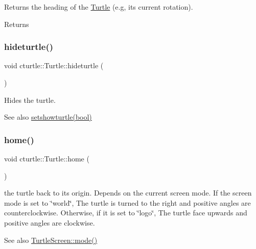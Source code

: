 Returns the heading of the \hyperlink{classcturtle_1_1Turtle}{Turtle} (e.\+g, its current rotation). \begin{DoxyReturn}{Returns}

\end{DoxyReturn}
\mbox{\label{classcturtle_1_1Turtle_a9703e6352bb71bb995ad0d364be66a49}} 
\subsubsection{\texorpdfstring{hideturtle()}{hideturtle()}}
{\footnotesize\ttfamily void cturtle\+::\+Turtle\+::hideturtle (\begin{DoxyParamCaption}{ }\end{DoxyParamCaption})\hspace{0.3cm}{\ttfamily [inline]}}



Hides the turtle. 

\begin{DoxySeeAlso}{See also}
\hyperlink{classcturtle_1_1Turtle_a9e83fdd5c469e4863cf9b460e4d29130}{setshowturtle(bool)} 
\end{DoxySeeAlso}
\mbox{\label{classcturtle_1_1Turtle_ab6558ff8b547bfb54a68c55259f7bb32}} 
\subsubsection{\texorpdfstring{home()}{home()}}
{\footnotesize\ttfamily void cturtle\+::\+Turtle\+::home (\begin{DoxyParamCaption}{ }\end{DoxyParamCaption})}

the turtle back to its origin. Depends on the current screen mode. If the screen mode is set to \char`\"{}world\char`\"{}, The turtle is turned to the right and positive angles are counterclockwise. Otherwise, if it is set to \char`\"{}logo\char`\"{}, The turtle face upwards and positive angles are clockwise. \begin{DoxySeeAlso}{See also}
\hyperlink{classcturtle_1_1InteractiveTurtleScreen_a1c666afe65211cf9eedaffa17206a697}{Turtle\+Screen\+::mode()} 
\end{DoxySeeAlso}
\mbox{\label{classcturtle_1_1Turtle_a60b8d0d7f9a80e4bca57bf3a788a6c01}} 
